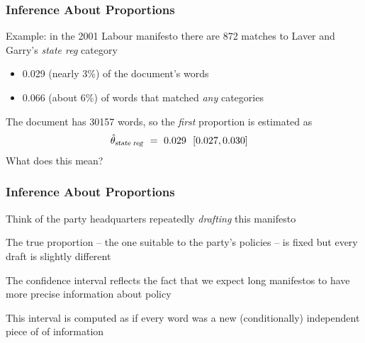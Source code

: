 \documentclass[11pt,compress,professionalfonts]{beamer}
\newcommand{\ita}{\begin{itemize}}
\newcommand{\itm}{\item[]}
\newcommand{\itz}{\end{itemize}}
\begin{document}
\begin{frame}[t,fragile]\frametitle{Inference About Proportions}

Example: in the 2001 Labour manifesto there are 872 matches to Laver and Garry's \textsl{state reg} category
\ita
\itm 0.029 (nearly 3\%) of the document's words
\itm 0.066 (about 6\%) of words that matched \textsl{any} categories
\itz
The document has 30157 words, so the \textsl{first} proportion is estimated as
\begin{align*}
\hat{\theta}_\text{\textsl{state reg}} & ~=~ 0.029 ~~[0.027, 0.030]
\end{align*}
What does this mean?

\end{frame}
\begin{frame}[t,fragile]\frametitle{Inference About Proportions}

Think of the party headquarters repeatedly \textsl{drafting} this manifesto

The true proportion -- the one suitable to the party's policies -- is fixed but every draft is slightly different

The confidence interval reflects the fact that we expect long manifestos to have more precise information about policy

This interval is computed as if every word was a new (conditionally) independent piece of of information

\end{frame}
\end{document}
